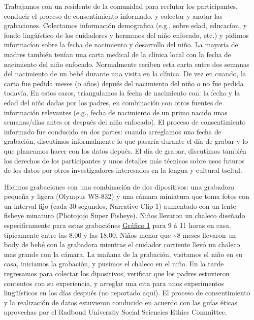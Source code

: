 \documentclass[
  english,
  ,man,floatsintext]{apa6}
\begin{document}
Trabajamos con un residente de la comunidad para reclutar los participantes, conducir el proceso de consentimiento informado, y colectar y anotar las grabaciones. Colectamos información demografica (e.g., sobre edad, educacíon, y fondo lingüístico de los cuidadores y hermanos del niño enfocado, etc.) y pidimos informacíon sobre la fecha de nacimiento y desarrollo del niño. La mayoría de madres también tenían una carta medical de la clínica local con la fecha de nacimiento del niño enfocado. Normalmente reciben esta carta entre dos semanas del nacimiento de un bebé durante una visita en la clínica. De vez en cuando, la carta fue pedida meses (o años) depués del nacimiento del niño o no fue pedida todavía. En estos casos, triangulamos la fecha de nacimiento con: la fecha y la edad del niño dadas por los padres, en combinación con otros fuentes de información relevantes (e.g., fecha de nacimiento de un primo nacido unas semanas/días antes or después del niño enfocado). El proceso de consentimiento informado fue conducido en dos partes: cuando arreglamos una fecha de grabación, discutimos informalmente lo que pasaría durante el día de grabar y lo que planeamos hacer con los datos depués. El día de grabar, discutimos también los derechos de los participantes y unos detalles más técnicos sobre usos futuros de los datos por otros investigadores interesados en la lengua y cultural tseltal.

Hicimos grabaciones con una combinación de dos dipositivos: una grabadora pequeña y ligera (Olympus WS-832) y una cámara miniatura que toma fotos con un interval fijo (cada 30 segundos; Narrative Clip 1) aumentado con un lente fisheye minaturo (Photojojo Super Fisheye). Niños llevaron un chaleco diseñado especificamente para estas grabaciónes \protect\hyperlink{fig1}{Gráfico 1} para 9 á 11 horas en casa, típicamente entre las 8.00 y las 18.00. Niños menor que \textasciitilde8 meses llevaron un body de bebé con la grabadora mientras el cuidador corriente llevó un chaleco mas grande con la cámara. La mañana de la grabación, visitamos el niño en su casa, iniciamos la grabación, y pusimos el chaleco en el niño. En la tarde regresamos para colectar los dipositivos, verificar que los padres estuvieron contentos con su experiencia, y arreglar una cita para unos experimentos lingüísticos en los días después (no reportado aquí). El proceso de consentimiento y la realización de datos estuvieron conducido en acuerdo con las guías éticas aprovechas por el Radboud University Social Sciencies Ethics Committee.
\end{document}
